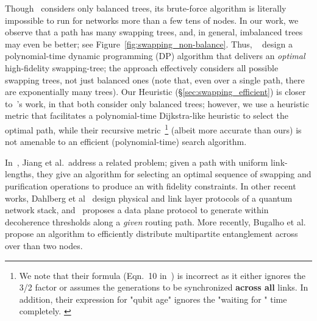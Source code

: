 Though~\cite{caleffi} considers only balanced trees, its 
brute-force algorithm is literally impossible to run for 
networks more than a few tens of nodes.
In our work, we observe that a path has many swapping trees, 
and, in general, imbalanced trees may even
be better; see Figure~\ref{fig:swapping_non-balance}. 
Thus, ~\cite{swapping-tqe-22} design a polynomial-time dynamic programming (DP) algorithm that delivers 
an \textit{optimal} high-fidelity swapping-tree;
the approach effectively considers all possible swapping trees, 
not just balanced ones (note that, even over a single path, 
there are exponentially many trees). 
Our \dpalt Heuristic (\S\ref{sec:swapping_efficient}) is closer to~\cite{caleffi}'s work, 
in that both 
consider only balanced trees; however, we use a heuristic metric that facilitates a polynomial-time Dijkstra-like heuristic to select the optimal path, while their recursive metric~\footnote{We note that their formula (Eqn.~10 in~\cite{caleffi}) is incorrect as it either ignores the 3/2 factor or assumes the \eps generations to be synchronized {\bf across all} links. In addition, their expression for "qubit age" ignores the "waiting for \es" time completely. \label{ft:swapping_wrong}} 
(albeit more accurate than ours) is not amenable to an efficient (polynomial-time) search algorithm. 

In~\cite{Jiang17291}, Jiang et al.\ address a related problem; given a 
path with uniform link-lengths, they give an algorithm for selecting an 
optimal sequence of swapping and purification operations 
to produce an \eps with fidelity constraints.  
In other recent works, Dahlberg et al~\cite{sigcomm19} design physical and link layer protocols
of a quantum network stack, and~\cite{conext20} proposes a data plane protocol to generate \epss
within decoherence thresholds along a \emph{given} routing path. 
More recently, Bugalho et al.~\cite{bugalho2021distributing} propose an algorithm to efficiently distribute multipartite entanglement across over than two nodes.



